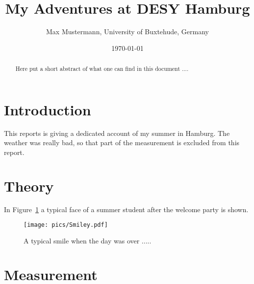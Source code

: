 \documentclass[12pt,oneside,notitlepage,abstracton,a4paper]{scrartcl}
\title{\Large My Adventures at DESY Hamburg}
\author{\normalsize Max Mustermann, University of Buxtehude, Germany}
\date{\normalsize \today}
\begin{document}
\maketitle

\begin{abstract}

\noindent
Here put a short abstract of what one can find in this document ....
\end{abstract}



\newpage


\tableofcontents
\newpage 

\section{Introduction}
\label{intro}

This reports is giving a dedicated account of my summer in Hamburg. The weather was really
bad, so that part of the measurement is excluded from this report. 


\section{Theory}

In Figure~\ref{fig:smiley} a typical face of a summer student after the welcome party is shown. 

\begin{figure}[h]
\begin{center}
\texttt{[image: pics/Smiley.pdf]}
\end{center}
\caption{A typical smile when the day was over .....}
\label{fig:smiley}
\end{figure}


\section{Measurement}
\end{document}
